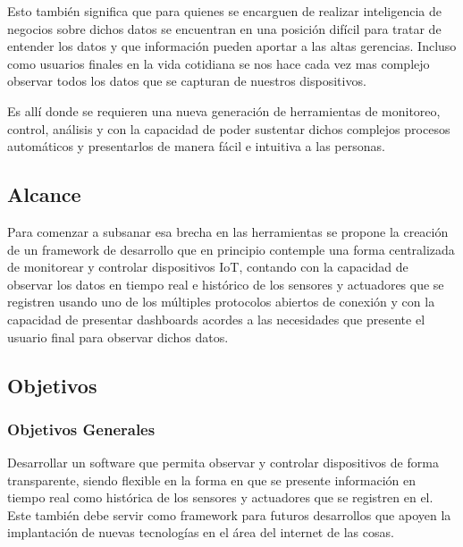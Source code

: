 Esto también significa que para quienes se encarguen de realizar inteligencia de negocios sobre dichos datos se encuentran en una posición difícil para tratar de entender los datos y que información pueden aportar a las altas gerencias. Incluso como usuarios finales en la vida cotidiana se nos hace cada vez mas complejo observar todos los datos que se capturan de nuestros dispositivos. 

Es allí donde se requieren una nueva generación de herramientas de monitoreo, control, análisis  y con la capacidad de poder sustentar dichos complejos procesos automáticos y presentarlos de manera fácil e intuitiva a las personas.

\subsection{Alcance}
Para comenzar a subsanar esa brecha en las herramientas se propone la creación de un framework de desarrollo que en principio contemple una forma centralizada de monitorear y controlar dispositivos IoT, contando con la capacidad de observar los datos en tiempo real e histórico de los sensores y actuadores que se registren usando uno de los múltiples protocolos abiertos de conexión y con la capacidad de presentar dashboards acordes a las necesidades que presente el usuario final para observar dichos datos.
 
\subsection{Objetivos}

\subsubsection{Objetivos Generales}
Desarrollar un software que permita observar y controlar dispositivos de forma transparente, siendo flexible en la forma en que se presente información en tiempo real como histórica de los sensores y actuadores que se registren en el. Este también debe servir como framework para futuros desarrollos que apoyen la implantación de nuevas tecnologías en el área del internet de las cosas.

